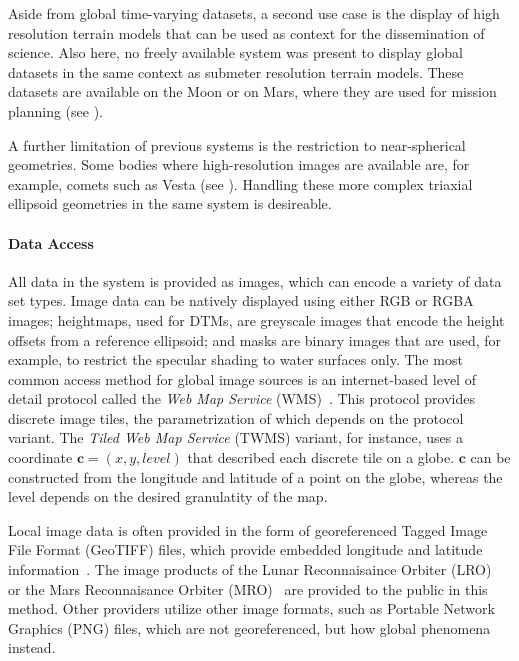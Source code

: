 Aside from global time-varying datasets, a second use case is the display of high resolution terrain models that can be used as context for the dissemination of science.  Also here, no freely available system was present to display global datasets in the same context as submeter resolution terrain models.  These datasets are available on the Moon or on Mars, where they are used for mission planning (see ).

A further limitation of previous systems is the restriction to near-spherical geometries.  Some bodies where high-resolution images are available are, for example, comets such as Vesta (see ).  Handling these more complex triaxial ellipsoid geometries in the same system is desireable.


\paragraph{Data Access} \label{contributions:astro:gb:access}
All data in the system is provided as  images, which can encode a variety of data set types.  Image data can be natively displayed using either RGB or RGBA images;  heightmaps, used for DTMs, are greyscale images that encode the height offsets from a reference ellipsoid;  and masks are binary images that are used, for example, to restrict the specular shading to water surfaces only.  The most common access method for global image sources is an internet-based level of detail protocol called the \emph{Web Map Service} (WMS)~\cite{open2006opengis, maso2010opengis}.  This protocol provides discrete image tiles, the parametrization of which depends on the protocol variant.  The \emph{Tiled Web Map Service} (TWMS) variant, for instance, uses a  coordinate $\textbf{c} = (x,y,level)$ that described each discrete tile on a globe.  $\textbf{c}$ can be constructed from the longitude and latitude of a point on the globe, whereas the level depends on the desired granulatity of the map.

Local image data is often provided in the form of georeferenced Tagged Image File Format (GeoTIFF) files, which provide embedded longitude and latitude information~\cite{ritter2000geotiff}.  The image products of the Lunar Reconnaisaince Orbiter (LRO)~\cite{vondrak2010lunar} or the Mars Reconnaisance Orbiter (MRO)~\cite{mcewen2016people} are provided to the public in this method.  Other providers utilize other image formats, such as Portable Network Graphics (PNG) files, which are not georeferenced, but how global phenomena instead.

